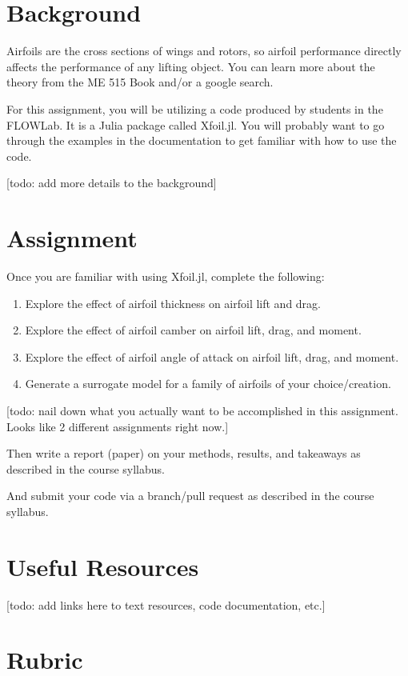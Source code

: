 \documentclass[12pt]{article}
\begin{document}
\section{Background}

Airfoils are the cross sections of wings and rotors, so airfoil performance directly affects the performance of any lifting object.
You can learn more about the theory from the ME 515 Book and/or a google search.

For this assignment, you will be utilizing a code produced by students in the FLOWLab.
It is a Julia package called Xfoil.jl.
You will probably want to go through the examples in the documentation to get familiar with how to use the code.

[todo: add more details to the background]

\section{Assignment}
Once you are familiar with using Xfoil.jl, complete the following:

\begin{enumerate}
	\item Explore the effect of airfoil thickness on airfoil lift and drag. 
	\item Explore the effect of airfoil camber on airfoil lift, drag, and moment.
	\item Explore the effect of airfoil angle of attack on airfoil lift, drag, and moment.
	\item Generate a surrogate model for a family of airfoils of your choice/creation.
\end{enumerate}
[todo: nail down what you actually want to be accomplished in this assignment.  Looks like 2 different assignments right now.]

\noindent Then write a report (paper) on your methods, results, and takeaways as described in the course syllabus.

\bigskip

\noindent And submit your code via a branch/pull request as described in the course syllabus.

\section{Useful Resources}

[todo: add links here to text resources, code documentation, etc.]

\section{Rubric}
\end{document}
